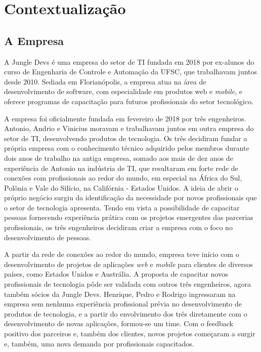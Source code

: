 \chapter{Contextualização}

\section{A Empresa}
A Jungle Devs  é uma empresa do setor de TI fundada em 2018 por ex-alunos do curso de Engenharia de Controle e Automação da UFSC, que trabalhavam juntos desde 2010. Sediada em Florianópolis, a empresa atua na área de desenvolvimento de software, com especialidade em produtos web e \textit{mobile}, e oferece programas de capacitação para futuros profissionais do setor tecnológico.

A empresa foi oficialmente fundada em fevereiro de 2018 por três engenheiros. Antonio, Andrio e Vinicius moravam e trabalhavam juntos em outra empresa do setor de TI, desenvolvendo produtos de tecnologia. Os três decidiram fundar a própria empresa com o conhecimento técnico adquirido pelos membros durante dois anos de trabalho na antiga empresa, somado aos mais de dez anos de experiência de Antonio na indústria de TI, que resultaram em forte rede de conexões com profissionais ao redor do mundo, em especial na África do Sul, Polônia e Vale do Silício, na Califórnia - Estados Unidos. A ideia de abrir o próprio negócio surgiu da identificação da necessidade por novos profissionais que o setor de tecnologia apresenta. Tendo em vista a possibilidade de capacitar pessoas fornecendo experiência prática com os projetos emergentes das parcerias profissionais, os três engenheiros decidiram criar a empresa com o foco no desenvolvimento de pessoas.

A partir da rede de conexões ao redor do mundo, empresa teve início com o desenvolvimento de projetos de aplicações \textit{web} e \textit{mobile} para clientes de diversos países, como Estados Unidos e Austrália. A proposta de capacitar novos profissionais de tecnologia pôde ser validada com outros três engenheiros, agora também sócios da Jungle Devs. Henrique, Pedro e Rodrigo ingressaram na empresa sem nenhuma experiência profissional prévia no desenvolvimento de produtos de tecnologia, e a partir do envolvimento dos três diretamente com o desenvolvimento de novas aplicações, formou-se um time. Com o feedback positivo dos parceiros e, também dos clientes, novos projetos começaram a surgir e, também, uma nova demanda por profissionais capacitados.

